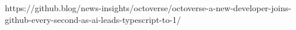 https://github.blog/news-insights/octoverse/octoverse-a-new-developer-joins-github-every-second-as-ai-leads-typescript-to-1/


\printbibliography[title={Tài liệu tham khảo}]